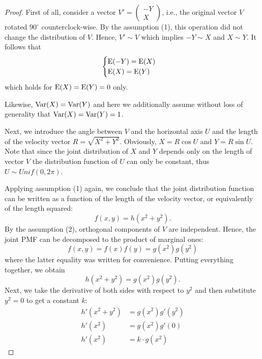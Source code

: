 \begin{proof}
First of all, consider a vector $V' = \begin{pmatrix} -Y \\ X \end{pmatrix}$, i.e.,
the original vector $V$ rotated $90^{\circ}$ counterclock-wise.
By the assumption (1), this operation did not change the distribution of $V$.
Hence, $V' \sim V$ which implies $-Y \sim X$ and $X \sim Y$.
It follows that
\[
\begin{cases}
\operatorname{E}(-Y) = \operatorname{E}(X) \\
\operatorname{E}(X) = \operatorname{E}(Y)
\end{cases}
\]
which holds for $\operatorname{E}(X) = \operatorname{E}(Y) = 0$ only.

Likewise, $\operatorname{Var}(X) = \operatorname{Var}(Y)$ and here we additionally assume
without loss of generality that $\operatorname{Var}(X) = \operatorname{Var}(Y) = 1$.

Next, we introduce the angle between $V$ and the horizontal axis $U$ and
the length of the velocity vector $R = \sqrt{X^2 + Y^2}$.
Obviously, $X = R \cos U$ and $Y = R \sin U$.
Note that since the joint distribution of $X$ and $Y$ depends only on
the length of vector $V$ the distribution function of $U$ can only be constant,
thus $U \sim Unif(0, 2\pi)$.

Applying assumption (1) again, we conclude that the joint distribution function
can be written as a function of the length of the velocity vector, or equivalently
of the length squared:
\[
f(x,y) = h(x^2 + y^2).
\]
By the assumption (2), orthogonal components of $V$ are independent.
Hence, the joint PMF can be decomposed to the product of marginal ones:
\[
f(x,y) = f(x)f(y) = g(x^2)g(y^2)
\]
where the latter equality was written for convenience.
Putting everything together, we obtain
\[
h(x^2 + y^2) = g(x^2)g(y^2).
\]
Next, we take the derivative of both sides with respect to $y^2$ and
then substitute $y^2 = 0$ to get a constant $k$:
\begin{align*}
h'(x^2 + y^2) &= g(x^2)g'(y^2) \\
h'(x^2) &= g(x^2)g'(0) \\
h'(x^2) &= k \cdot g(x^2)
\end{align*}



\end{proof}
